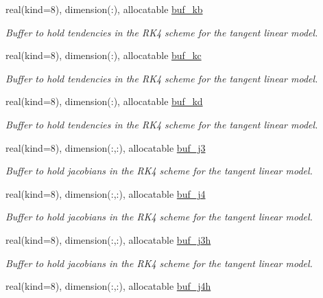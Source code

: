 \begin{DoxyCompactItemize}
real(kind=8), dimension(\+:), allocatable \hyperlink{namespacetl__ad__integrator_abd6a1c209bc0120ea4e1e473e067a902}{buf\+\_\+kb}
\begin{DoxyCompactList}\small\item\em Buffer to hold tendencies in the R\+K4 scheme for the tangent linear model. \end{DoxyCompactList}\item 
real(kind=8), dimension(\+:), allocatable \hyperlink{namespacetl__ad__integrator_a1cf59efa7229b47e580202dfe4bd4fd6}{buf\+\_\+kc}
\begin{DoxyCompactList}\small\item\em Buffer to hold tendencies in the R\+K4 scheme for the tangent linear model. \end{DoxyCompactList}\item 
real(kind=8), dimension(\+:), allocatable \hyperlink{namespacetl__ad__integrator_a3b72ebc24a7e0eb44e22e6489ac81ed3}{buf\+\_\+kd}
\begin{DoxyCompactList}\small\item\em Buffer to hold tendencies in the R\+K4 scheme for the tangent linear model. \end{DoxyCompactList}\item 
real(kind=8), dimension(\+:,\+:), allocatable \hyperlink{namespacetl__ad__integrator_afb500987b643ce33b2a549ba213221fc}{buf\+\_\+j3}
\begin{DoxyCompactList}\small\item\em Buffer to hold jacobians in the R\+K4 scheme for the tangent linear model. \end{DoxyCompactList}\item 
real(kind=8), dimension(\+:,\+:), allocatable \hyperlink{namespacetl__ad__integrator_a853bee458e7337f1556f19370dcbc9d6}{buf\+\_\+j4}
\begin{DoxyCompactList}\small\item\em Buffer to hold jacobians in the R\+K4 scheme for the tangent linear model. \end{DoxyCompactList}\item 
real(kind=8), dimension(\+:,\+:), allocatable \hyperlink{namespacetl__ad__integrator_a9ead2c02f871be0e94e91278fa71337c}{buf\+\_\+j3h}
\begin{DoxyCompactList}\small\item\em Buffer to hold jacobians in the R\+K4 scheme for the tangent linear model. \end{DoxyCompactList}\item 
real(kind=8), dimension(\+:,\+:), allocatable \hyperlink{namespacetl__ad__integrator_a99c2747c1997b622f4ab6170e3a8f23d}{buf\+\_\+j4h}

\end{DoxyCompactItemize}

